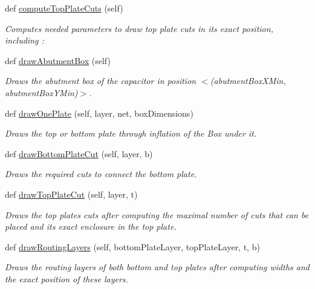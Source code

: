 \begin{DoxyCompactItemize}
def \mbox{\hyperlink{classpython_1_1capacitorunit_1_1CapacitorUnit_acf415dad7b8278ca474a08abd8386665}{compute\+Top\+Plate\+Cuts}} (self)
\begin{DoxyCompactList}\small\item\em Computes needed parameters to draw top plate cuts in its exact position, including \+: \end{DoxyCompactList}\item 
def \mbox{\hyperlink{classpython_1_1capacitorunit_1_1CapacitorUnit_ad3ea453f04d9ec2c38eab0ee8af8047d}{draw\+Abutment\+Box}} (self)
\begin{DoxyCompactList}\small\item\em Draws the abutment box of the capacitor in position {\ttfamily $<$}(abutment\+Box\+X\+Min, abutment\+Box\+Y\+Min)$>$. \end{DoxyCompactList}\item 
def \mbox{\hyperlink{classpython_1_1capacitorunit_1_1CapacitorUnit_a2b2756aa53569e2b59504ae6a7286653}{draw\+One\+Plate}} (self, layer, net, box\+Dimensions)
\begin{DoxyCompactList}\small\item\em Draws the top or bottom plate through inflation of the Box under it. \end{DoxyCompactList}\item 
def \mbox{\hyperlink{classpython_1_1capacitorunit_1_1CapacitorUnit_a727010b51f0670072cfe620aa0fb9973}{draw\+Bottom\+Plate\+Cut}} (self, layer, b)
\begin{DoxyCompactList}\small\item\em Draws the required cuts to connect the bottom plate. \end{DoxyCompactList}\item 
def \mbox{\hyperlink{classpython_1_1capacitorunit_1_1CapacitorUnit_aa4e6c1a2c4d502778db3d7f571cd8306}{draw\+Top\+Plate\+Cut}} (self, layer, t)
\begin{DoxyCompactList}\small\item\em Draws the top plate\textquotesingle{}s cuts after computing the maximal number of cuts that can be placed and its exact enclosure in the top plate. \end{DoxyCompactList}\item 
def \mbox{\hyperlink{classpython_1_1capacitorunit_1_1CapacitorUnit_a786938220c3b8fbe346cc53012385c4e}{draw\+Routing\+Layers}} (self, bottom\+Plate\+Layer, top\+Plate\+Layer, t, b)
\begin{DoxyCompactList}\small\item\em Draws the routing layers of both bottom and top plates after computing widths and the exact position of these layers. \end{DoxyCompactList}\item 

\end{DoxyCompactItemize}
